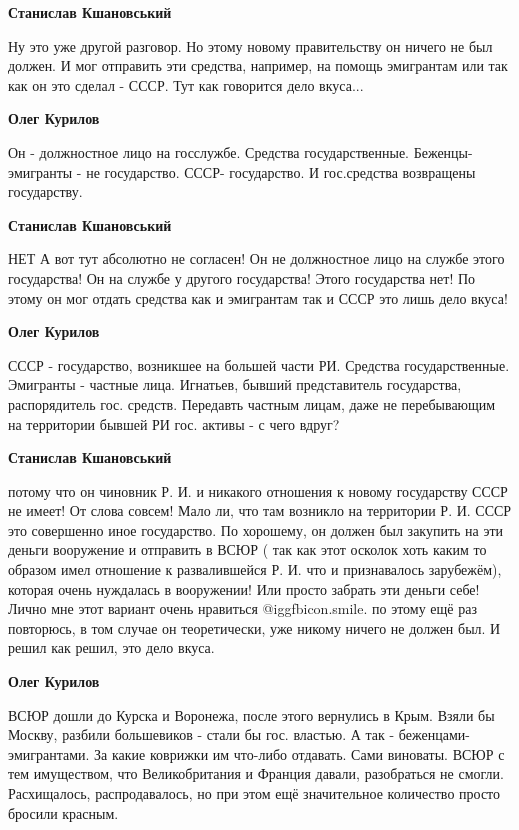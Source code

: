 \begin{itemize}
\begin{itemize}
\begin{itemize}
\textbf{Станислав Кшановський} 

Ну это уже другой разговор. Но этому новому правительству он ничего не был
должен. И мог отправить эти средства, например, на помощь эмигрантам или так
как он это сделал - СССР. Тут как говорится дело вкуса...

\textbf{Олег Курилов} 

Он - должностное лицо на госслужбе. Средства государственные. Беженцы-
эмигранты - не государство. СССР- государство. И гос.средства возвращены
государству.

\textbf{Станислав Кшановський} 

НЕТ А вот тут абсолютно не согласен! Он не должностное лицо на службе этого
государства! Он на службе у другого государства! Этого государства нет! По
этому он мог отдать средства как и эмигрантам так и СССР это лишь дело вкуса!

\textbf{Олег Курилов} 

СССР - государство, возникшее на большей части РИ. Средства
государственные. Эмигранты - частные лица. Игнатьев, бывший представитель
государства, распорядитель гос. средств. Передавть частным лицам, даже не
перебывающим на территории бывшей РИ гос. активы - с чего вдруг?


\textbf{Станислав Кшановський} 

потому что он чиновник Р. И. и никакого отношения к новому государству СССР не
имеет! От слова совсем! Мало ли, что там возникло на территории Р. И. СССР это
совершенно иное государство. По хорошему, он должен был закупить на эти деньги
вооружение и отправить в ВСЮР ( так как этот осколок хоть каким то образом имел
отношение к развалившейся Р. И. что и признавалось зарубежём), которая очень
нуждалась в вооружении! Или просто забрать эти деньги себе! Лично мне этот
вариант очень нравиться  @igg{fbicon.smile}. по этому ещё раз повторюсь, в том случае он
теоретически, уже никому ничего не должен был. И решил как решил, это дело
вкуса.

\textbf{Олег Курилов} 

ВСЮР дошли до Курска и Воронежа, после этого вернулись в Крым. Взяли бы Москву,
разбили большевиков - стали бы гос. властью. А так - беженцами- эмигрантами. За
какие коврижки им что-либо отдавать. Сами виноваты. ВСЮР с тем имуществом, что
Великобритания и Франция давали, разобраться не смогли. Расхищалось,
распродавалось, но при этом ещё значительное количество просто бросили
красным.


\end{itemize}
\end{itemize}
\end{itemize}
